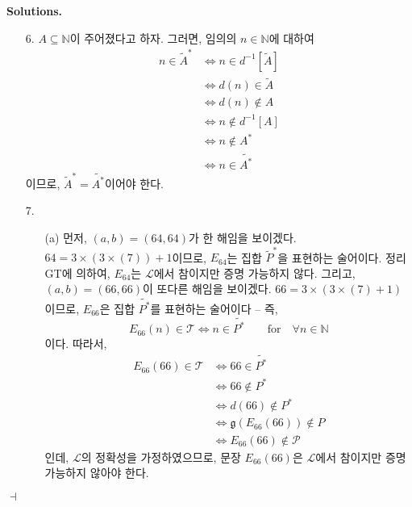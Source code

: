 \documentclass[12pt]{paper}
\newcommand{\gnum}{ \mathfrak{g} }
\newenvironment{context}[1][]{\noindent \textbf{{#1}.}}{\hfill $ \dashv $}
\begin{document}
\begin{context}[Solutions]
\begin{enumerate}
      \item[{6.}] $A \subseteq \mathbb{N}$이 주어졌다고 하자.
      그러면, 임의의 $n \in \mathbb{N}$에 대하여
      \begin{align*}
        n \in \tilde{A}^{*}
        & \iff n \in d^{-1} \left[ \tilde{A} \right] \\
        & \iff d \left( n \right) \in \tilde{A} \\
        & \iff d \left( n \right) \notin A \\
        & \iff n \notin d^{-1} \left[ A \right] \\
        & \iff n \notin A^{*} \\
        & \iff n \in \widetilde{A^{*}}
      \end{align*}
      이므로, $\tilde{A}^{*} = \widetilde{A^{*}}$이어야 한다.

      \item[{7.}]
      \begin{itemize}
        \item[(a)] 먼저, $\left( a , b \right) = \left( 64 , 64 \right)$가 한 해임을 보이겠다. 
        $64 = 3 \times \left( 3 \times \left( 7 \right) \right) + 1$이므로,
        $E_{64}$는 집합 $\tilde{P}^{*}$을 표현하는 술어이다.
        정리 GT에 의하여, $E_{64}$는 $\mathcal{L}$에서 참이지만 증명 가능하지 않다.
        그리고, $\left( a , b \right) = \left( 66 , 66 \right)$이 또다른 해임을 보이겠다.
        $66 = 3 \times \left( 3 \times \left( 7 \right) + 1 \right)$이므로,
        $E_{66}$은 집합 $\widetilde{P^{*}}$를 표현하는 술어이다 --
        즉, $$ E_{66} \left( n \right) \in \mathcal{T} \iff n \in \widetilde{P^{*}} \qquad \mathrm{for} \quad \forall n \in \mathbb{N} $$이다.
        따라서,
        \begin{align*}
          E_{66} \left( 66 \right) \in \mathcal{T}
          & \iff 66 \in \widetilde{P^{*}} \\
          & \iff 66 \notin P^{*} \\
          & \iff d \left( 66 \right) \notin P^{*} \\
          & \iff \gnum \left( E_{66} \left( 66 \right) \right) \notin P \\
          & \iff E_{66} \left( 66 \right) \notin \mathcal{P}
        \end{align*}
        인데, $\mathcal{L}$의 정확성을 가정하였으므로,
        문장 $E_{66} \left( 66 \right)$은 $\mathcal{L}$에서 참이지만 증명 가능하지 않아야 한다.


\end{itemize}
\end{enumerate}
\end{context}
\end{document}
